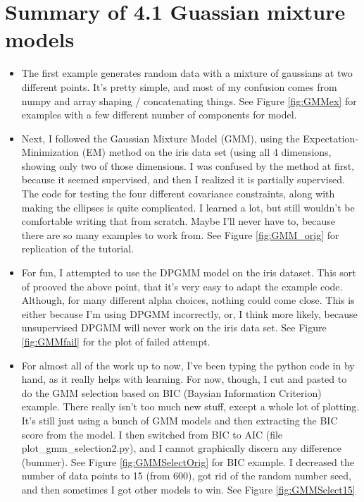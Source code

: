 \documentclass{article}
\begin{document}
	\section{Summary of 4.1 Guassian mixture models}

	\begin{itemize}
		\item The first example generates random data with a mixture of gaussians at two different points.  It's pretty simple, and most of my confusion comes from numpy and array shaping / concatenating things.  See Figure \ref{fig:GMMex} for examples with a few different number of components for model.
		\item Next, I followed the Gaussian Mixture Model (GMM), using the Expectation-Minimization (EM) method on the iris data set (using all 4 dimensions, showing only two of those dimensions.  I was confused by the method at first, because it seemed supervised, and then I realized it is partially supervised.  The code for testing the four different covariance constraints, along with making the ellipses is quite complicated.  I learned a lot, but still wouldn't be comfortable writing that from scratch.  Maybe I'll never have to, because there are so many examples to work from. See Figure \ref{fig:GMM_orig} for replication of the tutorial.
		\item For fun, I attempted to use the DPGMM model on the iris dataset.  This sort of prooved the above point, that it's very easy to adapt the example code.  Although, for many different alpha choices, nothing could come close.  This is either because I'm using DPGMM incorrectly, or, I think more likely, because unsupervised DPGMM will never work on the iris data set.  See Figure \ref{fig:GMMfail} for the plot of failed attempt.
		\item For almost all of the work up to now, I've been typing the python code in by hand, as it really helps with learning.  For now, though, I cut and pasted to do the GMM selection based on BIC (Baysian Information Criterion) example.  There really isn't too much new stuff, except a whole lot of plotting.  It's still just using a bunch of GMM models and then extracting the BIC score from the model. I then switched from BIC to AIC (file plot\_gmm\_selection2.py), and I cannot graphically discern any difference (bummer).  See Figure \ref{fig:GMMSelectOrig} for BIC example. I decreased the number of data points to 15 (from 600), got rid of the random number seed, and then sometimes I got other models to win.  See Figure \ref{fig:GMMSelect15}
	\end{itemize}
\end{document}
